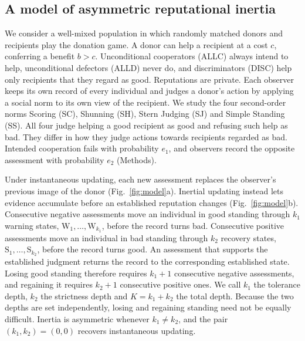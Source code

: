 \documentclass[10pt]{wlscirep}
\newcommand{\st}[1]{\mathrm{#1}}           %
\theoremstyle{plain}
\theoremstyle{remark}
\begin{document}
\subsection*{A model of asymmetric reputational inertia}

We consider a well-mixed population in which randomly matched donors and recipients play the donation game. A donor can help a recipient at a cost $c$, conferring a benefit $b>c$. Unconditional cooperators (ALLC) always intend to help, unconditional defectors (ALLD) never do, and discriminators (DISC) help only recipients that they regard as good. Reputations are private\cite{hilbe2018,okada2018}. Each observer keeps its own record of every individual and judges a donor's action by applying a social norm to its own view of the recipient. We study the four second-order norms Scoring (SC), Shunning (SH), Stern Judging (SJ) and Simple Standing (SS)\cite{ohtsuki2004}. All four judge helping a good recipient as good and refusing such help as bad. They differ in how they judge actions towards recipients regarded as bad. Intended cooperation fails with probability $e_1$, and observers record the opposite assessment with probability $e_2$ (Methods).

Under instantaneous updating, each new assessment replaces the observer's previous image of the donor (Fig.~\ref{fig:model}a). Inertial updating instead lets evidence accumulate before an established reputation changes (Fig.~\ref{fig:model}b). Consecutive negative assessments move an individual in good standing through $k_1$ warning states, $\st W_1,\ldots,\st W_{k_1}$, before the record turns bad. Consecutive positive assessments move an individual in bad standing through $k_2$ recovery states, $\st S_1,\ldots,\st S_{k_2}$, before the record turns good. An assessment that supports the established judgment returns the record to the corresponding established state. Losing good standing therefore requires $k_1+1$ consecutive negative assessments, and regaining it requires $k_2+1$ consecutive positive ones. We call $k_1$ the tolerance depth, $k_2$ the strictness depth and $K=k_1+k_2$ the total depth. Because the two depths are set independently, losing and regaining standing need not be equally difficult. Inertia is asymmetric whenever $k_1\neq k_2$, and the pair $(k_1,k_2)=(0,0)$ recovers instantaneous updating.
\end{document}
